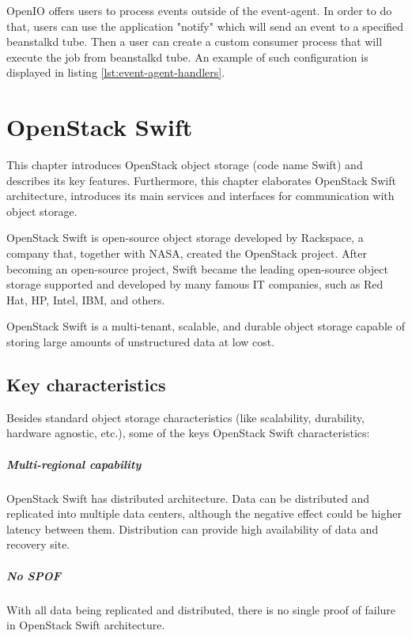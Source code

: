     OpenIO offers users to process events outside of the event-agent. In order to do that, users can use the application "notify" which will send an event to a specified beanstalkd tube. Then a user can create a custom consumer process that will execute the job from beanstalkd tube. An example of such configuration is displayed in listing \ref{lst:event-agent-handlers}.

\chapter{OpenStack Swift}\label{chap:swift}
    This chapter introduces OpenStack object storage (code name Swift) and describes its key features. Furthermore, this chapter elaborates OpenStack Swift architecture, introduces its main services and interfaces for communication with object storage.

    OpenStack Swift is open-source object storage developed by Rackspace, a company that, together with NASA, created the OpenStack project. After becoming an open-source project, Swift became the leading open-source object storage supported and developed by many famous IT companies, such as Red Hat, HP, Intel, IBM, and others.

    OpenStack Swift is a multi-tenant, scalable, and durable object storage capable of storing large amounts of unstructured data at low cost\cite{swiftOpenStackSwift}.

    \section{Key characteristics}
    Besides standard object storage characteristics (like scalability, durability, hardware agnostic, etc.), some of the keys OpenStack Swift characteristics:

    \paragraph{Multi-regional capability}
    OpenStack Swift has distributed architecture. Data can be distributed and replicated into multiple data centers, although the negative effect could be higher latency between them. Distribution can provide high availability of data and recovery site\cite{swiftOpenStackSwift}.

    \paragraph{No SPOF}
    With all data being replicated and distributed, there is no single proof of failure in OpenStack Swift architecture.

